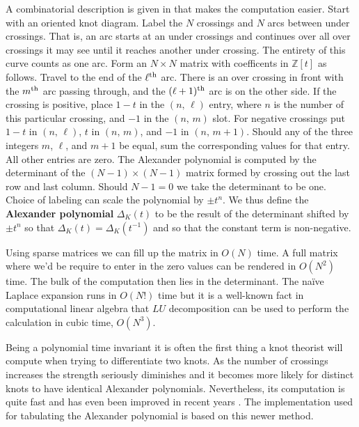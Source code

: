     A combinatorial description is given in \cite[p.~49]{LivingstonKnotTheory}
    that makes the computation easier. Start
    with an oriented knot diagram. Label the $N$ crossings and $N$ arcs
    between under crossings. That is, an arc starts at an under crossings and
    continues over all over crossings it may see until it reaches another
    under crossing. The entirety of this curve counts as one arc.
    Form an $N\times{N}$ matrix with coefficents in $\mathbb{Z}[t]$
    as follows. Travel to the end of the $\ell^{\small\textrm{th}}$ arc.
    There is an over crossing in front with the $m^{\small\textrm{th}}$
    arc passing through, and the $(\ell+1)^{\small\textrm{th}}$ arc is on the
    other side. If the crossing is positive, place $1-t$ in the
    $(n,\,\ell)$ entry, where $n$ is the number of this particular crossing,
    and $-1$ in the $(n,\,m)$ slot. For negative crossings put
    $1-t$ in $(n,\,\ell)$, $t$ in $(n,\,m)$, and
    $-1$ in $(n,\,m+1)$. Should any of the three integers $m$, $\ell$, and $m+1$
    be equal, sum the corresponding values for that entry. All other entries
    are zero. The Alexander polynomial is computed by the
    determinant of the $(N-1)\times(N-1)$ matrix formed by crossing out the
    last row and last column. Should $N-1=0$ we take the determinant to be
    one. Choice of labeling can scale the polynomial by $\pm{t}^{n}$. We thus
    define the \textbf{Alexander polynomial} $\Delta_{K}(t)$ to be the result of
    the determinant shifted by $\pm{t}^{n}$ so that
    $\Delta_{K}(t)=\Delta_{K}(t^{-1})$ and so that the constant term is
    non-negative.
    \par\hfill\par
    Using sparse matrices we can fill up the matrix in $O(N)$ time. A full
    matrix where we'd be require to enter in the zero values can be rendered
    in $O(N^{2})$ time. The bulk of the computation then lies in the
    determinant. The na\"{i}ve Laplace expansion runs in $O(N!)$ time but it
    is a well-known fact in computational linear algebra that $LU$
    decomposition can be used to perform the calculation in cubic time,
    $O(N^{3})$.
    \par\hfill\par
    Being a polynomial time invariant
    it is often the first thing a knot theorist will
    compute when trying to differentiate two knots. As the number of crossings
    increases the strength seriously diminishes and it becomes more likely
    for distinct knots to have identical Alexander polynomials. Nevertheless,
    its computation is quite fast and has even been improved in recent years
    \cite{BarNatanPolynomialTimeKnotPolynomials}. The implementation used
    for tabulating the Alexander polynomial is based on this newer method.
